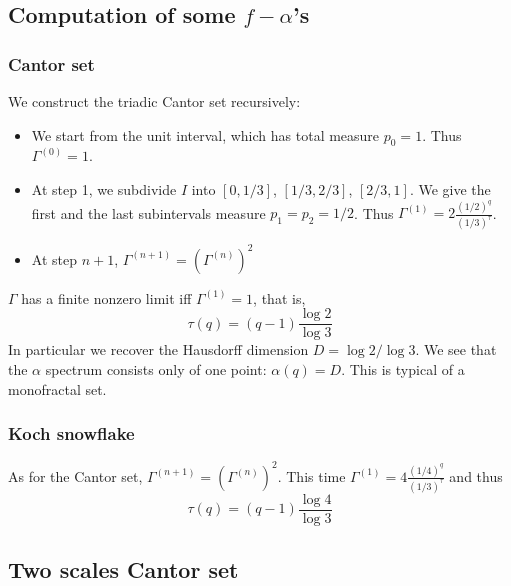 \documentclass[11pt]{article}
\begin{document}
\subsection{Computation of some $f -\alpha$'s}

\subsubsection{Cantor set}
We construct the triadic Cantor set recursively:
\begin{itemize}
	\item  We start from the unit interval, which has total measure $p_0 = 1$. Thus $\Gamma^{(0)} = 1$.
	\item At step 1, we subdivide $I$ into $[0,1/3]$, $[1/3,2/3]$, $[2/3,1]$. We give the first and the last subintervals measure $p_1 = p_2 = 1/2$. Thus $\Gamma^{(1)} = 2 \frac{(1/2)^q}{(1/3)^\tau}$.
	\item At step $n+1$, $\Gamma^{(n+1)} = \left(\Gamma^{(n)}\right)^2$
\end{itemize}
$\Gamma$ has a finite nonzero limit iff $\Gamma^{(1)} = 1$, that is,
\begin{equation}
\boxed{
	\tau(q) =(q-1) \frac{\log 2}{\log 3}
}
\end{equation}
In particular we recover the Hausdorff dimension $D = \log 2/ \log 3$. We see that the $\alpha$ spectrum consists only of one point: $\alpha(q) = D$. This is typical of a monofractal set.

\subsubsection{Koch snowflake}
As for the Cantor set, $\Gamma^{(n+1)} = \left( \Gamma^{(n)} \right)^2$. 
This time $\Gamma^{(1)} = 4 \frac{(1/4)^q}{(1/3)^\tau}$ and thus
\begin{equation}
\boxed{
	\tau(q) = (q-1)\frac{\log 4}{\log 3}
}
\end{equation}

\subsection{Two scales Cantor set}
\end{document}
